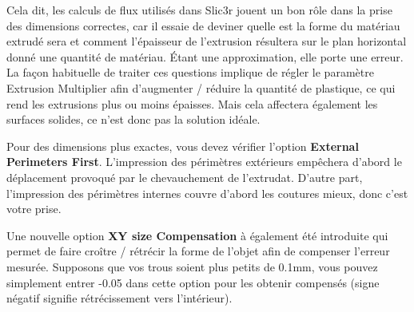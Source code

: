 Cela dit, les calculs de flux utilisés dans Slic3r jouent un bon rôle dans la prise des dimensions correctes, car il essaie de deviner quelle est la forme du matériau extrudé sera et comment l'épaisseur de l'extrusion résultera sur le plan horizontal donné une quantité de matériau. Étant une approximation, elle porte une erreur. La façon habituelle de traiter ces questions implique de régler le paramètre Extrusion Multiplier afin d'augmenter / réduire la quantité de plastique, ce qui rend les extrusions plus ou moins épaisses. Mais cela affectera également les surfaces solides, ce n'est donc pas la solution idéale.

Pour des dimensions plus exactes, vous devez vérifier l'option \textbf{External Perimeters First}. L'impression des périmètres extérieurs empêchera d'abord le déplacement provoqué par le chevauchement de l'extrudat. D'autre part, l'impression des périmètres internes couvre d'abord les coutures mieux, donc c'est votre prise.

Une nouvelle option \textbf{XY size Compensation} à également été introduite qui permet de faire croître / rétrécir la forme de l'objet afin de compenser l'erreur mesurée. Supposons que vos trous soient plus petits de 0.1mm, vous pouvez simplement entrer -0.05 dans cette option pour les obtenir compensés (signe négatif signifie rétrécissement vers l'intérieur).
